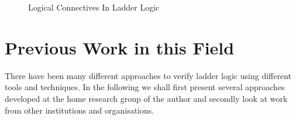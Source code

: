 \begin{figure}[h!]
 \begin{center}
\end{center}

\label{fig:ladderconnectives}
\caption{Logical Connectives In Ladder Logic}

\end{figure}

\medskip
\begin{comment}
In section 4 an approach is presented to capture the semantics of ladder logic
programs using propositional logic.
\end{comment}

\section{Previous Work in this Field}
There have been many different approaches to verify ladder logic using different tools and techniques. In the following we shall first present several approaches developed at the home research group of the author and secondly look at work from other institutions and organisations. 



